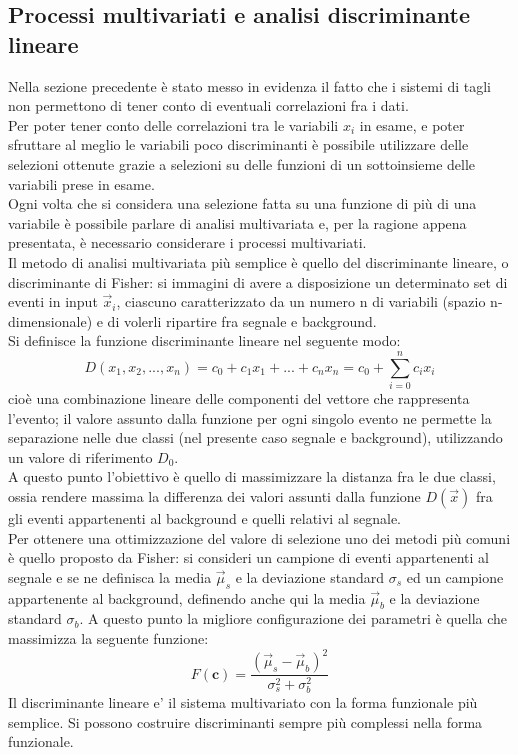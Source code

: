 \newpage
\subsection{Processi multivariati e analisi discriminante lineare}
\label{metodi lineari e discriminante di Fisher}

Nella sezione precedente è stato messo in evidenza il fatto che i sistemi di tagli non permettono di tener conto di eventuali correlazioni fra i dati.\\
Per poter tener conto delle correlazioni tra le variabili $x_i$ in esame, e poter sfruttare al meglio le variabili poco discriminanti è possibile utilizzare delle selezioni ottenute grazie a selezioni su delle funzioni di un sottoinsieme delle variabili prese in esame. \\
Ogni volta che si considera una selezione fatta su una funzione di più di una variabile è possibile parlare di analisi multivariata e, per la ragione appena presentata, è necessario considerare i processi multivariati.\\
Il metodo di analisi multivariata più semplice è quello del discriminante lineare, o discriminante di Fisher: si immagini di avere a disposizione un determinato set di eventi in input $\vec{x}_i$, ciascuno caratterizzato da un numero n di variabili (spazio n-dimensionale) e di volerli ripartire fra segnale e background.\\
Si definisce la funzione discriminante lineare nel seguente modo:
\begin{equation}
D(x_1 , x_2 , ... , x_n) = c_0 + c_1x_1 + ... +c_nx_n = c_0 + \sum_{i=0}^{n} c_ix_i 
\end{equation}
cioè una combinazione lineare delle componenti del vettore che rappresenta l'evento; il valore assunto dalla funzione per ogni singolo evento ne permette la separazione nelle due classi (nel presente caso segnale e background), utilizzando un valore di riferimento $D_0$. \\
A questo punto l'obiettivo è quello di massimizzare la distanza fra le due classi, ossia rendere massima la differenza dei valori assunti dalla funzione $D(\vec{x})$ fra gli eventi appartenenti al background e quelli relativi al segnale. \\
Per ottenere una ottimizzazione del valore di selezione uno dei metodi più comuni è quello proposto da Fisher: si consideri un campione di eventi appartenenti al segnale e se ne definisca la media $\vec\mu_s$ e la deviazione standard $\sigma_s$ ed un campione appartenente al background, definendo anche qui la media $\vec\mu_b$ e la deviazione standard $\sigma_b$. A questo punto la migliore configurazione dei parametri è quella che massimizza la seguente funzione: 
\begin{equation}
F(\textbf{c}) = \frac{(\vec\mu_s - \vec\mu_b)^2}{\sigma_s^2 + \sigma_b^2}
\end{equation} 
Il discriminante lineare e' il sistema multivariato con la forma funzionale più semplice. Si possono costruire discriminanti sempre più complessi nella forma funzionale.

